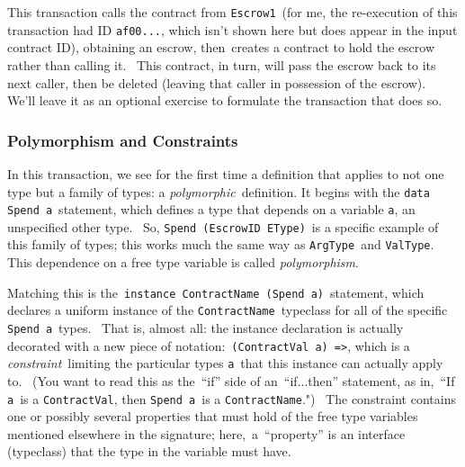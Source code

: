 \documentclass[11pt]{article}
\begin{document}
This transaction calls the contract from \texttt{Escrow1} (for me, the re-execution of this transaction had ID \texttt{af00...}, which isn't shown here but does appear in the input contract ID), obtaining an escrow, then creates a contract to hold the escrow rather than calling it.  This contract, in turn, will pass the escrow back to its next caller, then be deleted (leaving that caller in possession of the escrow).  We'll leave it as an optional exercise to formulate the transaction that does so.

\subsubsection{Polymorphism and Constraints}
\vspace{5.5pt}

In this transaction, we see for the first time a definition that applies to not one type but a family of types: a \textit{polymorphic} definition. It begins with the \texttt{data Spend a} statement, which defines a type that depends on a variable \texttt{a}, an unspecified other type.  So, \texttt{Spend (EscrowID EType)} is a specific example of this family of types; this works much the same way as \texttt{ArgType} and \texttt{ValType}.  This dependence on a free type variable is called \textit{polymorphism}.


\vspace{11pt}

Matching this is the \texttt{instance ContractName (Spend a)} statement, which declares a uniform instance of the \texttt{ContractName} typeclass for all of the specific \texttt{Spend a} types.  That is, almost all: the instance declaration is actually decorated with a new piece of notation: \texttt{(ContractVal a) =}\texttt{\textgreater{}}, which is a \textit{constraint} limiting the particular types \texttt{a} that this instance can actually apply to.  (You want to read this as the “if” side of an “if...then” statement, as in, “If \texttt{a} is a \texttt{ContractVal}, then \texttt{Sp}\texttt{end a} is a \texttt{ContractName}.")  The constraint contains one or possibly several properties that must hold of the free type variables mentioned elsewhere in the signature; here, a “property” is an interface (typeclass) that the type in the variable must have.


\vspace{11pt}
\end{document}
